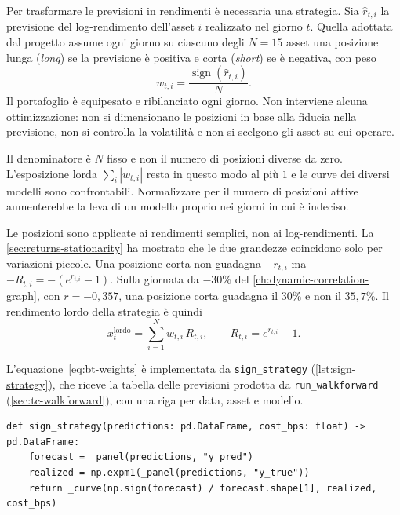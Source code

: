Per trasformare le previsioni in rendimenti è necessaria una strategia. Sia $\hat r_{t,i}$ la previsione del log-rendimento dell'asset $i$ realizzato nel giorno $t$. Quella adottata dal progetto assume ogni giorno su ciascuno degli $N=15$ asset una posizione lunga (\emph{long}) se la previsione è positiva e corta (\emph{short}) se è negativa, con peso
\begin{equation}
\label{eq:bt-weights}
w_{t,i}=\frac{\operatorname{sign}(\hat r_{t,i})}{N}.
\end{equation}
Il portafoglio è equipesato e ribilanciato ogni giorno. Non interviene alcuna ottimizzazione: non si dimensionano le posizioni in base alla fiducia nella previsione, non si controlla la volatilità e non si scelgono gli asset su cui operare.

Il denominatore è $N$ fisso e non il numero di posizioni diverse da zero. L'esposizione lorda $\sum_i|w_{t,i}|$ resta in questo modo al più $1$ e le curve dei diversi modelli sono confrontabili. Normalizzare per il numero di posizioni attive aumenterebbe la leva di un modello proprio nei giorni in cui è indeciso.

Le posizioni sono applicate ai rendimenti semplici, non ai log-rendimenti. La \cref{sec:returns-stationarity} ha mostrato che le due grandezze coincidono solo per variazioni piccole. Una posizione corta non guadagna $-r_{t,i}$ ma $-R_{t,i}=-(e^{r_{t,i}}-1)$. Sulla giornata da $-30\%$ del \cref{ch:dynamic-correlation-graph}, con $r=-0{,}357$, una posizione corta guadagna il $30\%$ e non il $35{,}7\%$. Il rendimento lordo della strategia è quindi
\begin{equation}
\label{eq:bt-gross-return}
x_t^{\mathrm{lordo}}=\sum_{i=1}^N w_{t,i}\,R_{t,i},\qquad R_{t,i}=e^{r_{t,i}}-1.
\end{equation}

L'equazione~\eqref{eq:bt-weights} è implementata da \texttt{sign\_strategy} (\cref{lst:sign-strategy}), che riceve la tabella delle previsioni prodotta da \texttt{run\_walkforward} (\cref{sec:tc-walkforward}), con una riga per data, asset e modello.

\begin{listing}[H]
\begin{verbatim}
def sign_strategy(predictions: pd.DataFrame, cost_bps: float) -> pd.DataFrame:
    forecast = _panel(predictions, "y_pred")
    realized = np.expm1(_panel(predictions, "y_true"))
    return _curve(np.sign(forecast) / forecast.shape[1], realized, cost_bps)
\end{verbatim}
\caption{\texttt{sign\_strategy}}
\label{lst:sign-strategy}
\end{listing}

